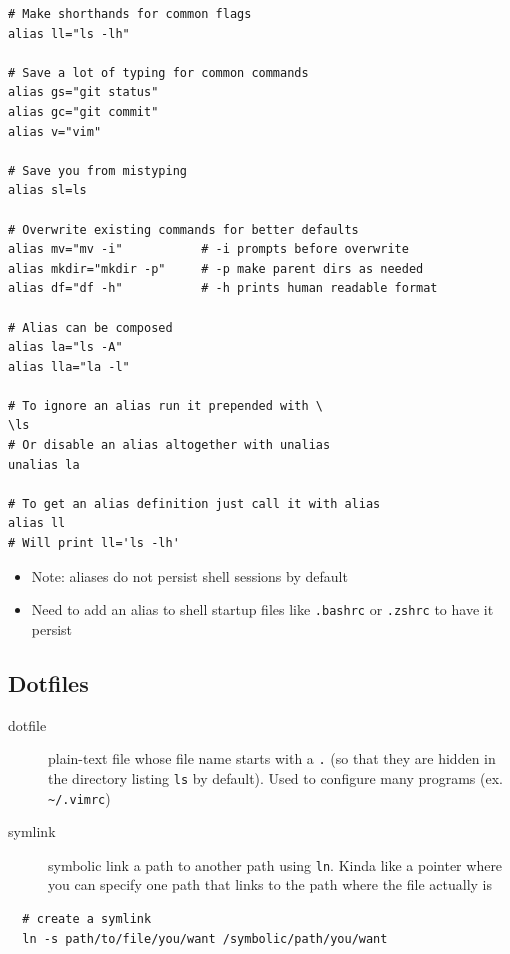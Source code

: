 \documentclass[letterpaper,12pt]{article}
\begin{document}
\begin{lstlisting}
# Make shorthands for common flags
alias ll="ls -lh"

# Save a lot of typing for common commands
alias gs="git status"
alias gc="git commit"
alias v="vim"

# Save you from mistyping
alias sl=ls

# Overwrite existing commands for better defaults
alias mv="mv -i"           # -i prompts before overwrite
alias mkdir="mkdir -p"     # -p make parent dirs as needed
alias df="df -h"           # -h prints human readable format

# Alias can be composed
alias la="ls -A"
alias lla="la -l"

# To ignore an alias run it prepended with \
\ls
# Or disable an alias altogether with unalias
unalias la

# To get an alias definition just call it with alias
alias ll
# Will print ll='ls -lh'
\end{lstlisting}

\begin{itemize}
 \item Note: aliases do not persist shell sessions by default
 \item Need to add an alias to shell startup files like \lstinline{.bashrc} or \lstinline{.zshrc} to have it persist
\end{itemize}

\subsection{Dotfiles}

\begin{description}
 \item[dotfile] plain-text file whose file name starts with a \lstinline{.} (so that they are hidden in the directory listing \lstinline{ls} by default). Used to configure many programs (ex. \lstinline{~/.vimrc})
 \item[symlink] symbolic link a path to another path using \lstinline{ln}. Kinda like a pointer where you can specify one path that links to the path where the file actually is
\end{description}

\begin{lstlisting}
  # create a symlink
  ln -s path/to/file/you/want /symbolic/path/you/want
\end{lstlisting}
\end{document}
